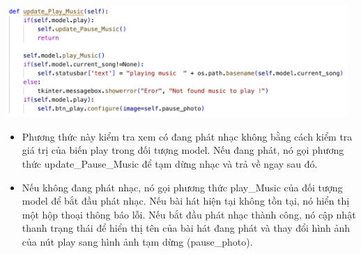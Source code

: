 \documentclass[a4paper]{article}
\begin{document}
\begin{center}
\includegraphics[width=130mm]{template_SGU 2/audio_updatePlay.png}
\end{center}
\begin{itemize}
    \item Phương thức này kiểm tra xem có đang phát nhạc không bằng cách kiểm tra giá trị của biến play trong đối tượng model. Nếu đang phát, nó gọi phương thức update\_Pause\_Music để tạm dừng nhạc và trả về ngay sau đó.
    \item Nếu không đang phát nhạc, nó gọi phương thức play\_Music của đối tượng model để bắt đầu phát nhạc. Nếu bài hát hiện tại không tồn tại, nó hiển thị một hộp thoại thông báo lỗi. Nếu bắt đầu phát nhạc thành công, nó cập nhật thanh trạng thái để hiển thị tên của bài hát đang phát và thay đổi hình ảnh của nút play sang hình ảnh tạm dừng (pause\_photo).
\end{itemize}
\end{document}

